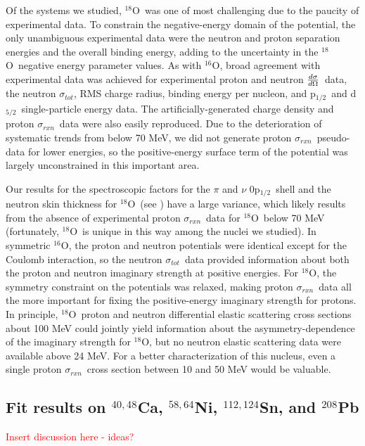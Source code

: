 \documentclass[twocolumn,secnumarabic,amssymb, nobibnotes, aps, prl,
superscriptaddress, nobalancelastpage, draft]{revtex4}
\newcommand{\tot}{\ensuremath{\sigma_{tot}}}
\newcommand{\rxn}{\ensuremath{\sigma_{rxn}}}
\newcommand{\el}{\ensuremath{\frac{\lowercase{d}\sigma}{\lowercase{d}\Omega}}}
\newcommand{\oSix}{\ensuremath{^{16}}O}
\newcommand{\oEight}{\ensuremath{^{18}}O}
\newcommand{\caAughtEight}{\ensuremath{^{40,48}}C\lowercase{a}}
\newcommand{\niEightFour}{\ensuremath{^{58,64}}N\lowercase{i}}
\newcommand{\snTwelveFour}{\ensuremath{^{112,124}}S\lowercase{n}}
\newcommand{\pbEight}{\ensuremath{^{208}}P\lowercase{b}}
\newcommand{\pOne}{p\ensuremath{_{1/2}}}
\newcommand{\dFive}{d\ensuremath{_{5/2}}}
\begin{document}
Of the systems we studied, \oEight\ was one of most challenging due to the 
paucity of experimental data. To constrain the negative-energy domain
of the potential, the only unambiguous experimental data were the neutron
and proton separation energies and the overall binding energy, adding
to the uncertainty in the \oEight\ negative energy parameter values.
As with \oSix, broad agreement with experimental data was achieved for
experimental proton and neutron \el\ data, the neutron \tot, RMS charge radius,
binding energy per nucleon, and \pOne\ and \dFive\ single-particle energy data.
The artificially-generated charge density and proton \rxn\ data were also
easily reproduced. Due to the deterioration of systematic trends from
\cite{Carlson1975} below 70 MeV, we did not generate proton \rxn\ pseudo-data
for lower energies, so the positive-energy surface term of the potential
was largely unconstrained in this important area.

Our results for the spectroscopic factors for the $\pi$ and $\nu$ 0\pOne\ shell and the
neutron skin thickness for \oEight\ (see \cite{Pruitt2020PRL}) have a large variance,
which likely results from the absence of experimental proton \rxn\ data for
\oEight\ below 70 MeV (fortunately, \oEight\ is unique in this way among the
nuclei we studied). 
In symmetric \oSix, the proton and neutron potentials were identical except for
the Coulomb interaction, so the neutron \tot\ data provided information about
both the proton and neutron imaginary strength at positive energies. For
\oEight, the symmetry constraint on the potentials was relaxed, making proton
\rxn\ data all the more important for fixing the positive-energy imaginary
strength for protons. In principle, \oEight\ proton and neutron
differential elastic scattering cross sections about 100 MeV could jointly
yield information about the asymmetry-dependence of the imaginary strength for
\oEight, but no neutron elastic scattering data were available above 24 MeV. For
a better characterization of this nucleus, even a single proton \rxn\ cross
section between 10 and 50 MeV would be valuable.

\subsection{Fit results on \caAughtEight, \niEightFour, \snTwelveFour, and \pbEight}
\textcolor{red}{Insert discussion here - ideas?}
\end{document}
